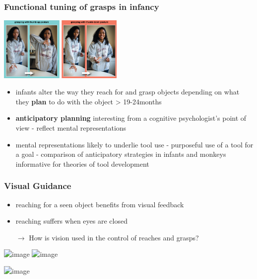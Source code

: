 \documentclass[]{beamer}
\begin{document}
\begin{frame}
 \frametitle{Functional tuning of grasps in infancy}
\begin{overlayarea}{110mm}{80mm}

\begin{center}
\includegraphics[width=60mm]{figs/l9/grasp_planning.png}
\end{center}
\begin{itemize}
 \item<2-> infants alter the way they reach for and grasp objects depending on what they \textbf{plan} to do with the object > 19-24months
 \item<3-> \textbf{anticipatory planning} interesting from a cognitive psychologist's point of view - reflect mental representations
 \item<4-> mental representations likely to underlie tool use - purposeful use of a tool for a goal - comparison of anticipatory strategies in infants and monkeys informative for theories of tool development
\end{itemize}
\end{overlayarea}
\end{frame}

\begin{frame}
 \frametitle{Visual Guidance}
\begin{overlayarea}{120mm}{90mm}
\begin{itemize}
 \item reaching for a seen object benefits from visual feedback
 \item reaching suffers when eyes are closed
 \item[$\rightarrow$] How is vision used in the control of reaches and grasps?
\end{itemize}

\begin{center}
\includegraphics<1>[width=50mm]{figs/l9/visual_guidance.png}
\includegraphics<2->[width=90mm]{figs/l9/soma_setup.png}

\includegraphics<3>[width=50mm]{figs/l9/rbo_traces_blurred.png}
\end{center}
\end{overlayarea}
\end{frame}
\end{document}
